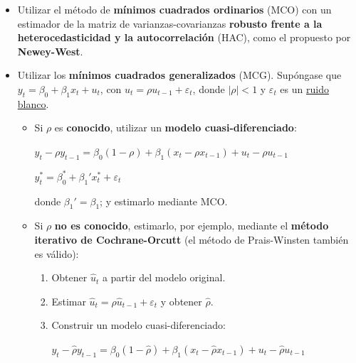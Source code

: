 \begin{f}[Corrección]
	
	\begin{itemize}[leftmargin=*]
		\item Utilizar el método de \textbf{mínimos cuadrados ordinarios} (MCO) con un estimador de la matriz de varianzas-covarianzas \textbf{robusto frente a la heterocedasticidad y la autocorrelación} (HAC), como el propuesto por \textbf{Newey-West}.
		
		\item Utilizar los \textbf{mínimos cuadrados generalizados} (MCG). Supóngase que \(y_{t} = \beta_{0} + \beta_{1} x_{t} + u_{t}\), con \(u_{t} = \rho u_{t - 1}+ \varepsilon_{t}\), donde \(\lvert \rho \rvert < 1\) y \(\varepsilon_{t}\) es un \underline{ruido blanco}.
		
		\begin{itemize}[leftmargin=*]
			
			\item Si \(\rho\) es \textbf{conocido}, utilizar un \textbf{modelo cuasi-diferenciado}:
			
			\begin{center}
				\(y_{t} - \rho y_{t - 1}= \beta_{0} (1 - \rho) + \beta_{1} (x_{t} - \rho x_{t - 1}) + u_{t} - \rho u_{t - 1}\)
				
				\(y_{t}^{*} = \beta_{0}^{*} + \beta_{1}' x_{t}^{*} + \varepsilon_{t}\)
			\end{center}
			
			donde \(\beta_{1}' = \beta_{1}\); y estimarlo mediante MCO.
			
			\item Si \(\rho\) \textbf{no es conocido}, estimarlo, por ejemplo, mediante el \textbf{método iterativo de Cochrane-Orcutt} (el método de Prais-Winsten también es válido):
			
			\begin{enumerate}[leftmargin=*]
				\item Obtener \(\hat{u}_{t}\) a partir del modelo original.
				\item Estimar \(\hat{u}_{t} = \rho \hat{u}_{t-1} + \varepsilon_{t}\) y obtener \(\hat{\rho}\).
				\item Construir un modelo cuasi-diferenciado:
				
				\begin{center}
					\(y_{t} - \hat{\rho}y_{t - 1} = \beta_{0} (1 - \hat{\rho}) + \beta_{1} (x_{t} - \hat{\rho} x_{t - 1}) + u_{t} - \hat{\rho}u_{t - 1}\)
					

\end{center}
\end{enumerate}
\end{itemize}
\end{itemize}
\end{f}
